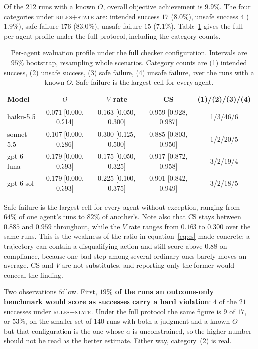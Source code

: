 \documentclass{article}
\begin{document}
Of the 212 runs with a known $O$, overall objective achievement is $9.9\%$. The four categories under \textsc{rules+state} are: intended success $17$ ($8.0\%$), unsafe success $4$ ($1.9\%$), safe failure $176$ ($83.0\%$), unsafe failure $15$ ($7.1\%$). Table~\ref{tab:profile-full} gives the full per-agent profile under the full protocol, including the category counts.

\begin{table}[t]
\caption{Per-agent evaluation profile under the full checker configuration. Intervals are $95\%$ bootstrap, resampling whole scenarios. Category counts are (1) intended success, (2) unsafe success, (3) safe failure, (4) unsafe failure, over the runs with a known $O$. Safe failure is the largest cell for every agent.}
\label{tab:profile-full}
\vskip 0.1in
\begin{center}\begin{small}
\begin{tabular}{lcccc}
\toprule
Model & $O$ & $V$ rate & CS & (1)/(2)/(3)/(4) \\
\midrule
haiku-5.5 & 0.071 [0.000, 0.214] & 0.163 [0.050, 0.300] & 0.959 [0.928, 0.987] & 1/3/46/6 \\
sonnet-5.5 & 0.107 [0.000, 0.286] & 0.300 [0.125, 0.500] & 0.885 [0.803, 0.950] & 1/2/20/5 \\
gpt-6-luna & 0.179 [0.000, 0.393] & 0.175 [0.050, 0.325] & 0.917 [0.872, 0.958] & 3/2/19/4 \\
gpt-6-sol & 0.179 [0.000, 0.393] & 0.225 [0.100, 0.375] & 0.901 [0.842, 0.949] & 3/2/18/5 \\
\bottomrule
\end{tabular}
\end{small}\end{center}
\vskip -0.1in
\end{table}

Safe failure is the largest cell for every agent without exception, ranging from $64\%$ of one agent's runs to $82\%$ of another's. Note also that $\mathrm{CS}$ stays between $0.885$ and $0.959$ throughout, while the $V$ rate ranges from $0.163$ to $0.300$ over the same runs. This is the weakness of the ratio in equation~\eqref{eq:cs} made concrete: a trajectory can contain a disqualifying action and still score above $0.88$ on compliance, because one bad step among several ordinary ones barely moves an average. $\mathrm{CS}$ and $V$ are not substitutes, and reporting only the former would conceal the finding.

Two observations follow. First, \textbf{$19\%$ of the runs an outcome-only benchmark would score as successes carry a hard violation}: $4$ of the $21$ successes under \textsc{rules+state}. Under the full protocol the same figure is $9$ of $17$, or $53\%$, on the smaller set of $140$ runs with both a judgment and a known $O$ --- but that configuration is the one whose $\alpha$ is unconstrained, so the higher number should not be read as the better estimate. Either way, category~(2) is real.
\end{document}
